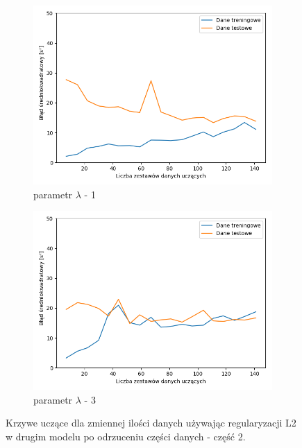 \documentclass[12pt]{aghdpl}
\begin{document}
		\begin{figure}[h]
			\centering
		 	\begin{subfigure}{.8\linewidth}
		 		\includegraphics[width =\linewidth]{wykresy/7_badanie_danych/l2/regularyzacja_1_learning_curves.png}
		 		\caption{parametr $\lambda$ - 1}
		 	\end{subfigure}
		 	\begin{subfigure}{.8\linewidth}
		 		\includegraphics[width =\linewidth]{wykresy/7_badanie_danych/l2/regularyzacja_3_learning_curves.png}
		 		\caption{parametr $\lambda$ - 3}
		 	\end{subfigure}
	 	
 			\caption{Krzywe uczące dla zmiennej ilości danych używając regularyzacji L2 w drugim modelu po odrzuceniu części danych - część 2.}
			\label{fig: drugi_model_przy_regularyzacji_l2_po_odrzuceniu_czesci_danych_learning_curves_2}
		\end{figure}		
		
\end{document}
